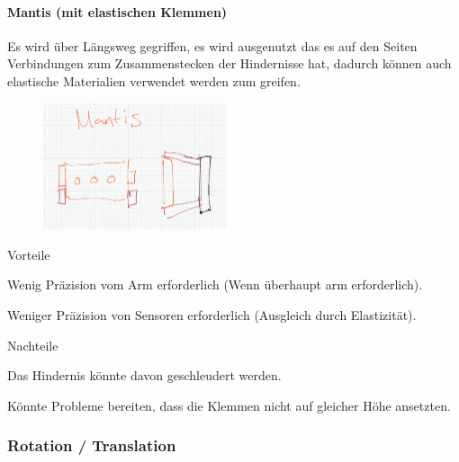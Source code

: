 \paragraph{Mantis (mit elastischen Klemmen)}
Es wird über Längsweg gegriffen, es wird ausgenutzt das es auf den Seiten Verbindungen zum Zusammenstecken der Hindernisse hat, dadurch können auch elastische Materialien verwendet werden zum greifen.

\begin{figure}[h!]
        \centering
        \includegraphics[width=0.48\textwidth]{img/technologierecherche/Aufnahme/Mantis.jpg}
        \caption{}
        \label{img:tech_Mantis}
\end{figure}

\begin{minipage}[t]{0.48\textwidth}
    \begin{items}
          \item [Vorteile]
          \item Wenig Präzision vom Arm erforderlich (Wenn überhaupt arm erforderlich).
          \item Weniger Präzision von Sensoren erforderlich (Ausgleich durch Elastizität).
    \end{items}
\end{minipage}
\hfill
\begin{minipage}[t]{0.48\textwidth}
    \begin{items}
          \item [Nachteile]
          \item Das Hindernis könnte davon geschleudert werden.
          \item Könnte Probleme bereiten, dass die Klemmen nicht auf gleicher Höhe ansetzten.
    \end{items}
\end{minipage}
\newpage
\subsubsection{Rotation / Translation}
